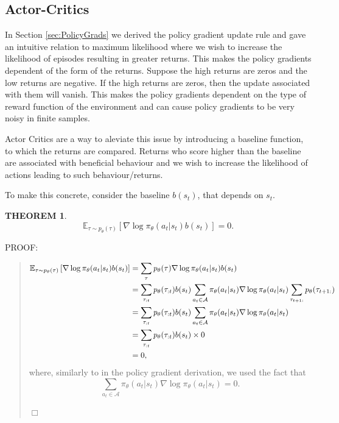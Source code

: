 \documentclass{report}
\newtheorem{theorem}{THEOREM}
\newenvironment{proof}{
PROOF:
\begin{quotation}}{
$\Box$ \end{quotation}}
\numberwithin{equation}{section}
\numberwithin{figure}{section}
\numberwithin{table}{section}
\numberwithin{algorithm}{section}
\begin{document}
\subsection{Actor-Critics}
In Section \ref{sec:PolicyGrads} we derived the policy gradient 
update rule and gave an intuitive relation to maximum likelihood 
where we wish to increase the likelihood of episodes resulting 
in greater returns. This makes the policy gradients dependent of 
the form of the returns. Suppose the high returns are zeros and 
the low returns are negative. If the high returns are zeros, then 
the update associated with them will vanish. This makes the policy 
gradients dependent on the type of reward function of the environment 
and can cause policy gradients to be very noisy in finite samples.

Actor Critics \citep{Tsitsiklis} are a way to aleviate this issue 
by introducing a baseline function, to which the returns are compared.
Returns who score higher than the baseline are associated with 
beneficial behaviour and we wish to increase the likelihood 
of actions leading to such behaviour/returns.

To make this concrete, consider the baseline $b(s_t)$, that depends 
on $s_t$.

\begin{theorem}\label{thm:baselineThm}
  \begin{equation*}
    \mathbb{E}_{\tau\sim p_\theta(\tau)}\left[\nabla \log \pi_\theta(a_t|s_t)
    b(s_t)\right]=0.  
  \end{equation*}
\end{theorem}

\begin{proof}
  \begin{align}
    \mathbb{E}_{\tau\sim p_\theta(\tau)}\left[\nabla \log \pi_\theta(a_t|s_t)
    b(s_t)\right]&= \sum_{\tau}p_\theta(\tau)\nabla \log\pi_\theta(a_t|s_t)b(s_t)\notag\\
    &=\sum_{\tau_{:t}}p_\theta(\tau_{:t})b(s_t)\sum_{a_t\in\mathcal{A}}\pi_\theta(a_t|s_t)\nabla \log\pi_\theta(a_t|s_t) \sum_{\tau_{t+1:}}p_\theta(\tau_{t+1:})\notag\\
    &=\sum_{\tau_{:t}}p_\theta(\tau_{:t})b(s_t)\sum_{a_t\in\mathcal{A}}\pi_\theta(a_t|s_t)\nabla \log\pi_\theta(a_t|s_t)\notag\\
    &=\sum_{\tau_{:t}}p_\theta(\tau_{:t})b(s_t)\times 0\notag\\
    &=0,
  \end{align}
  where, similarly to in the policy gradient derivation, we used the fact that 
  \begin{equation*}
    \sum_{a_t\in\mathcal{A}}\pi_\theta(a_t|s_t)\nabla \log\pi_\theta(a_t|s_t)=0. 
  \end{equation*}
\end{proof}
\end{document}
